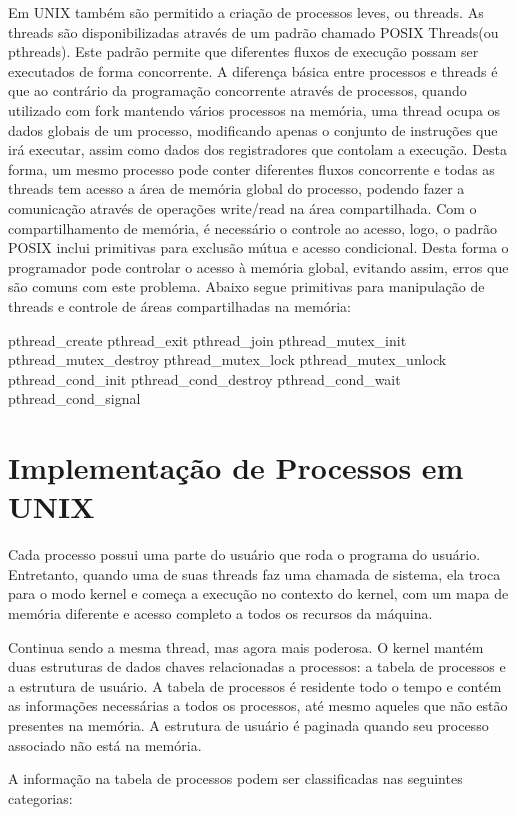 Em UNIX também são permitido a criação de processos leves, ou threads. As threads são disponibilizadas através de um padrão chamado POSIX Threads(ou pthreads). Este padrão permite que diferentes fluxos de execução possam ser executados de forma concorrente. A diferença básica entre processos e threads é que ao contrário da programação concorrente através de processos, quando utilizado com fork mantendo vários processos na memória, uma thread ocupa os dados globais de um processo, modificando apenas o conjunto de instruções que irá executar, assim como dados dos registradores que contolam a execução. Desta forma, um mesmo processo pode conter diferentes fluxos concorrente e todas as threads tem acesso a área de memória global do processo, podendo fazer a comunicação através de operações write/read na área compartilhada. Com o compartilhamento de memória, é necessário o controle ao acesso, logo, o padrão POSIX inclui primitivas para exclusão mútua e acesso condicional. Desta forma o programador pode controlar o acesso à memória global, evitando assim, erros que são comuns com este problema. Abaixo segue primitivas para manipulação de threads e controle de áreas compartilhadas na memória:

	pthread\_create\(\)
	pthread\_exit
	pthread\_join
	pthread\_mutex\_init
	pthread\_mutex\_destroy
	pthread\_mutex\_lock
	pthread\_mutex\_unlock
	pthread\_cond\_init
	pthread\_cond\_destroy
	pthread\_cond\_wait
	pthread\_cond\_signal

\section{Implementação de Processos em UNIX}

Cada processo possui uma parte do usuário que roda o programa do usuário. Entretanto, quando uma de suas threads faz uma chamada de sistema, ela troca para o modo kernel e começa a execução no contexto do kernel, com um mapa de memória diferente e acesso completo a todos os recursos da máquina.

Continua sendo a mesma thread, mas agora mais poderosa. O kernel mantém duas estruturas de dados chaves relacionadas a processos: a tabela de processos e a estrutura de usuário. A tabela de processos é residente todo o tempo e contém as informações necessárias a todos os processos, até mesmo aqueles que não estão presentes na memória. A estrutura de usuário é paginada quando seu processo associado não está na memória.

A informação na tabela de processos podem ser classificadas nas seguintes categorias:

